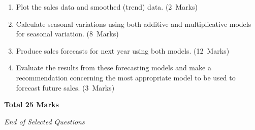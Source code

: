\documentclass[11pt,a4paper]{article}
\newcommand{\markalloc}[1]{\nobreak\hfill\mbox{(#1 Marks)}}
\newcommand{\questiontotal}[1]{\begin{flushright}\textbf{Total #1 Marks}\end{flushright}}
\begin{document}
\begin{enumerate}
\item Plot the sales data and smoothed (trend) data. \markalloc{2}

\item Calculate seasonal variations using both additive and multiplicative models for seasonal variation. \markalloc{8}

\item Produce sales forecasts for next year using both models. \markalloc{12}

\item Evaluate the results from these forecasting models and make a recommendation concerning the most appropriate model to be used to forecast future sales. \markalloc{3}
\end{enumerate}

\questiontotal{25}

\vfill

\begin{center}
\textit{End of Selected Questions}
\end{center}
\end{document}
